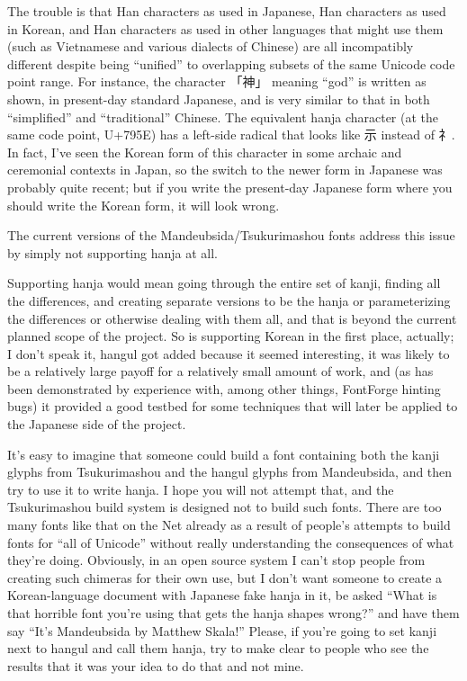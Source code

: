 \documentclass[14pt]{extarticle}
\begin{document}
The trouble is that Han characters as used in Japanese, Han characters as
used in Korean, and Han characters as used in other languages that might use
them (such as Vietnamese and various dialects of Chinese) are all
incompatibly different despite being ``unified'' to overlapping subsets of
the same Unicode code point range.  For instance, the character 「神」
meaning ``god'' is written as shown, in present-day standard Japanese, and is
very similar to that in both ``simplified'' and ``traditional'' Chinese.
The equivalent hanja character (at the same code point, U+795E) has a
left-side radical that looks like 示 instead of 礻.  In fact, I've seen the
Korean form of this character in some archaic and ceremonial contexts in
Japan, so the switch to the newer form in Japanese was probably quite
recent; but if you write the present-day Japanese form where you should
write the Korean form, it will look wrong.

The current versions of the Mandeubsida/Tsukurimashou fonts address this issue
by simply not supporting hanja at all.

Supporting hanja would mean going through the entire set of kanji, finding
all the differences, and creating separate versions to be the hanja or
parameterizing the differences or otherwise dealing with them all, and that
is beyond the current planned scope of the project.  So is supporting Korean
in the first place, actually; I don't speak it, hangul got added because it
seemed interesting, it was likely to be a relatively large payoff for a
relatively small amount of work, and (as has been demonstrated by experience
with, among other things, FontForge hinting bugs) it provided a good testbed
for some techniques that will later be applied to the Japanese side of the
project.

It's easy to imagine that someone could build a font containing both the
kanji glyphs from Tsukurimashou and the hangul glyphs from Mandeubsida, and
then try to use it to write hanja.  I hope you will not attempt that, and
the Tsukurimashou build system is designed not to build such fonts.  There
are too many fonts like that on the Net already as a result of people's
attempts to build fonts for ``all of Unicode'' without really understanding
the consequences of what they're doing.  Obviously, in an open source system
I can't stop people from creating such chimeras for their own use, but I
don't want someone to create a Korean-language document with Japanese fake
hanja in it, be asked ``What is that horrible font you're using that gets
the hanja shapes wrong?'' and have them say ``It's Mandeubsida by Matthew
Skala!'' Please, if you're going to set kanji next to hangul and call them
hanja, try to make clear to people who see the results that it was your idea
to do that and not mine.
\end{document}
